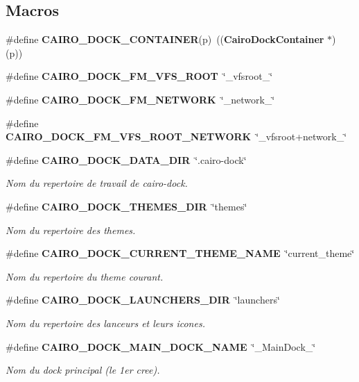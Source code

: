 \subsection*{Macros}
\begin{CompactItemize}
\item 
\#define {\bf CAIRO\_\-DOCK\_\-CONTAINER}(p)~(({\bf CairoDockContainer} $\ast$) (p))
\item 
\#define {\bf CAIRO\_\-DOCK\_\-FM\_\-VFS\_\-ROOT}~\char`\"{}\_\-vfsroot\_\-\char`\"{}
\item 
\#define {\bf CAIRO\_\-DOCK\_\-FM\_\-NETWORK}~\char`\"{}\_\-network\_\-\char`\"{}
\item 
\#define {\bf CAIRO\_\-DOCK\_\-FM\_\-VFS\_\-ROOT\_\-NETWORK}~\char`\"{}\_\-vfsroot+network\_\-\char`\"{}
\item 
\#define {\bf CAIRO\_\-DOCK\_\-DATA\_\-DIR}~\char`\"{}.cairo-dock\char`\"{}
\begin{CompactList}\small\item\em Nom du repertoire de travail de cairo-dock. \item\end{CompactList}\item 
\#define {\bf CAIRO\_\-DOCK\_\-THEMES\_\-DIR}~\char`\"{}themes\char`\"{}
\begin{CompactList}\small\item\em Nom du repertoire des themes. \item\end{CompactList}\item 
\#define {\bf CAIRO\_\-DOCK\_\-CURRENT\_\-THEME\_\-NAME}~\char`\"{}current\_\-theme\char`\"{}
\begin{CompactList}\small\item\em Nom du repertoire du theme courant. \item\end{CompactList}\item 
\#define {\bf CAIRO\_\-DOCK\_\-LAUNCHERS\_\-DIR}~\char`\"{}launchers\char`\"{}
\begin{CompactList}\small\item\em Nom du repertoire des lanceurs et leurs icones. \item\end{CompactList}\item 
\#define {\bf CAIRO\_\-DOCK\_\-MAIN\_\-DOCK\_\-NAME}~\char`\"{}\_\-MainDock\_\-\char`\"{}
\begin{CompactList}\small\item\em Nom du dock principal (le 1er cree). \item\end{CompactList}\item 

\end{CompactItemize}
